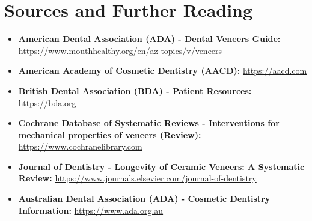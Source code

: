\section*{Sources and Further Reading}
\begin{itemize}
    \item \textbf{American Dental Association (ADA) - Dental Veneers Guide:} \newline \url{https://www.mouthhealthy.org/en/az-topics/v/veneers}
    \item \textbf{American Academy of Cosmetic Dentistry (AACD):} \newline \url{https://aacd.com}
    \item \textbf{British Dental Association (BDA) - Patient Resources:} \newline \url{https://bda.org}
    \item \textbf{Cochrane Database of Systematic Reviews - Interventions for mechanical properties of veneers (Review):} \newline \url{https://www.cochranelibrary.com}
    \item \textbf{Journal of Dentistry - Longevity of Ceramic Veneers: A Systematic Review:} \newline \url{https://www.journals.elsevier.com/journal-of-dentistry}
    \item \textbf{Australian Dental Association (ADA) - Cosmetic Dentistry Information:} \newline \url{https://www.ada.org.au}
\end{itemize}